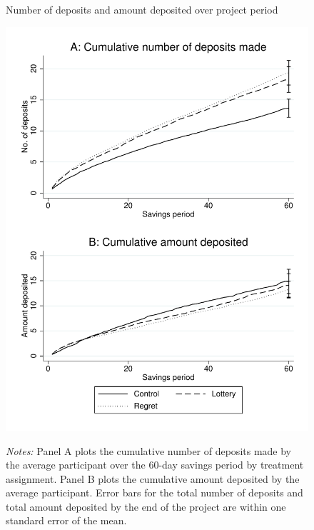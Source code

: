 \documentclass[12pt]{article}
\begin{document}
	\begin{figure}[h]
		\centering
		\caption{Number of deposits and amount deposited over project period}
		\includegraphics[height=0.85\textheight]{../../figures/line-cumdeposits.pdf}
		\label{fig:line-cumdeposits}
		\caption*{\footnotesize \emph{Notes:} Panel A plots the cumulative number of deposits made by the average participant over the 60-day savings period by treatment assignment. Panel B plots the cumulative amount deposited by the average participant. Error bars for the total number of deposits and total amount deposited by the end of the project are within one standard error of the mean.}
	\end{figure}


%
\end{document}
